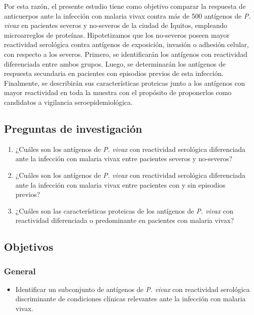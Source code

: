 \documentclass[]{article}
\providecommand{\tightlist}{%
  \setlength{\itemsep}{0pt}\setlength{\parskip}{0pt}}
\begin{document}
Por esta razón, el presente estudio tiene como objetivo comparar la
respuesta de anticuerpos ante la infección con malaria vivax contra más
de 500 antígenos de \emph{P. vivax} en pacientes severos y no-severos de
la ciudad de Iquitos, empleando microarreglos de proteínas.
Hipotetizamos que los no-severos poseen mayor reactividad serológica
contra antígenos de exposición, invasión o adhesión celular, con
respecto a los severos. Primero, se identificarán los antígenos con
reactividad diferenciada entre ambos grupos. Luego, se determinarán los
antígenos de respuesta secundaria en pacientes con episodios previos de
esta infección. Finalmente, se describirán sus características proteicas
junto a los antígenos con mayor reactividad en toda la muestra con el
propósito de proponerlos como candidatos a vigilancia
seroepidemiológica.

\subsection{Preguntas de
investigación}\label{preguntas-de-investigacion}

\begin{enumerate}
\def\labelenumi{\arabic{enumi}.}
\item
  ¿Cuáles son los antígenos de \emph{P. vivax} con reactividad
  serológica diferenciada ante la infección con malaria vivax entre
  pacientes severos y no-severos?
\item
  ¿Cuáles son los antígenos de \emph{P. vivax} con reactividad
  serológica diferenciada ante la infección con malaria vivax entre
  pacientes con y sin episodios previos?
\item
  ¿Cuáles son las características proteicas de los antígenos de \emph{P.
  vivax} con reactividad diferenciada o predominante en pacientes con
  malaria vivax?
\end{enumerate}

\subsection{Objetivos}\label{objetivos}

\subsubsection{General}\label{general}

\begin{itemize}
\tightlist
\item
  Identificar un subconjunto de antígenos de \emph{P. vivax} con
  reactividad serológica discriminante de condiciones clínicas
  relevantes ante la infección con malaria vivax.
\end{itemize}
\end{document}
